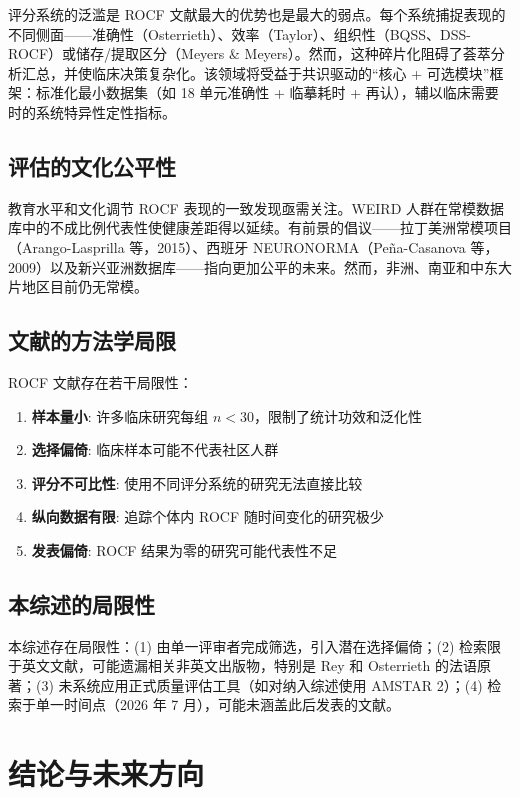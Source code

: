\documentclass[12pt,a4paper]{ctexart}
\begin{document}
评分系统的泛滥是 ROCF 文献最大的优势也是最大的弱点。每个系统捕捉表现的不同侧面——准确性（Osterrieth）、效率（Taylor）、组织性（BQSS、DSS-ROCF）或储存/提取区分（Meyers \& Meyers）。然而，这种碎片化阻碍了荟萃分析汇总，并使临床决策复杂化。该领域将受益于共识驱动的``核心 + 可选模块''框架：标准化最小数据集（如 18 单元准确性 + 临摹耗时 + 再认），辅以临床需要时的系统特异性定性指标。

\subsection{评估的文化公平性}

教育水平和文化调节 ROCF 表现的一致发现亟需关注。WEIRD 人群在常模数据库中的不成比例代表性使健康差距得以延续。有前景的倡议——拉丁美洲常模项目（Arango-Lasprilla 等，2015）、西班牙 NEURONORMA（Peña-Casanova 等，2009）以及新兴亚洲数据库——指向更加公平的未来。然而，非洲、南亚和中东大片地区目前仍无常模。

\subsection{文献的方法学局限}

ROCF 文献存在若干局限性：

\begin{enumerate}
\item \textbf{样本量小}: 许多临床研究每组 $n < 30$，限制了统计功效和泛化性
\item \textbf{选择偏倚}: 临床样本可能不代表社区人群
\item \textbf{评分不可比性}: 使用不同评分系统的研究无法直接比较
\item \textbf{纵向数据有限}: 追踪个体内 ROCF 随时间变化的研究极少
\item \textbf{发表偏倚}: ROCF 结果为零的研究可能代表性不足
\end{enumerate}

\subsection{本综述的局限性}

本综述存在局限性：(1) 由单一评审者完成筛选，引入潜在选择偏倚；(2) 检索限于英文文献，可能遗漏相关非英文出版物，特别是 Rey 和 Osterrieth 的法语原著；(3) 未系统应用正式质量评估工具（如对纳入综述使用 AMSTAR 2）；(4) 检索于单一时间点（2026 年 7 月），可能未涵盖此后发表的文献。

\section{结论与未来方向}
\end{document}
